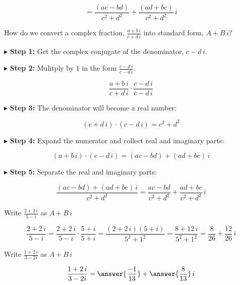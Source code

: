\documentclass{ximera}
\begin{document}
\[
= \frac{(ac - bd)}{c^2 + d^2}  + \frac{(ad + bc)}{c^2 + d^2} \, i
\]







\begin{procedure}


How do we convert a complex fraction, $\frac{a + b \, i}{c + d \, i}$ into standard form, $A + B \, i$?



$\blacktriangleright$ \textbf{Step 1:}   Get the complex conjugate of the denominator, $c - d \, i$.


$\blacktriangleright$ \textbf{Step 2:} Mulitply by $1$ in the form $\frac{c - d \, i}{c - d \, i}$.

\[
\frac{a + b \, i}{c + d \, i} \cdot \frac{c - d \, i}{c - d \, i}
\]

$\blacktriangleright$ \textbf{Step 3:}  The denominator will become a real number:  

\[ (c + d \, i) \cdot (c - d \, i) = c^2 + d^2 \]



$\blacktriangleright$ \textbf{Step 4:}  Expand the numerator and collect real and imaginary parts: 

\[ (a + b \, i) \cdot (c - d \, i) = (ac-bd) + (ad + bc) \, i \]


$\blacktriangleright$ \textbf{Step 5:} Separate the real and imaginary parts: 

\[
\frac{(ac-bd) + (ad + bc) \, i}{c^2 + d^2} = \frac{ac - bd}{c^2 + d^2} + \frac{ad + bc}{c^2 + d^2} \, i
\] 



\end{procedure}





\begin{example}




Write $\frac{2 + 2 \, i}{5 - i}$ as $A + B \, i$


\begin{explanation}

\[
\frac{2 + 2 \, i}{5 - i} = \frac{2 + 2 \, i}{5 - i} \cdot \frac{5 + i}{5 + i} = \frac{(2 + 2 \, i)(5 + i)}{5^2 + 1^2} = \frac{8 + 12 \, i}{5^2 + 1^2} = \frac{8}{26} + \frac{12}{26} \, i
\]


\end{explanation}


\end{example}










\begin{question}


Write $\frac{1 + 2 \, i}{3 - 2i}$ as $A + B \, i$


\[
\frac{1 + 2 \, i}{3 - 2i} = \answer{\frac{-1}{13}} + \answer{\frac{8}{13}} \, i
\]

\end{question}
\end{document}
